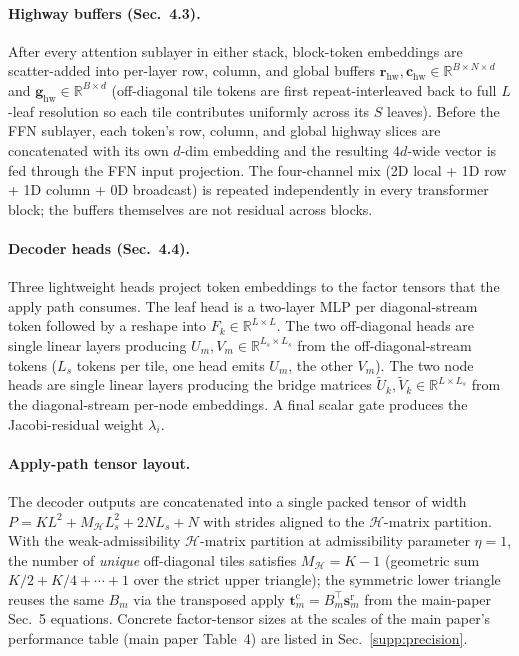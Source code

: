\documentclass[acmtog,anonymous,review]{acmart}
\begin{document}
\paragraph{Highway buffers (Sec.~4.3).}
After every attention sublayer in either stack, block-token embeddings are
scatter-added into per-layer row, column, and global buffers
$\mathbf{r}_{\mathrm{hw}}, \mathbf{c}_{\mathrm{hw}}\!\in\!\mathbb{R}^{B\times N\times d}$
and $\mathbf{g}_{\mathrm{hw}}\!\in\!\mathbb{R}^{B\times d}$ (off-diagonal tile
tokens are first repeat-interleaved back to full $L$-leaf resolution so each tile
contributes uniformly across its $S$ leaves). Before the FFN sublayer, each
token's row, column, and global highway slices are concatenated with its own
$d$-dim embedding and the resulting $4d$-wide vector is fed through the FFN input
projection. The four-channel mix (2D local + 1D row + 1D column + 0D broadcast)
is repeated independently in every transformer block; the buffers themselves are
not residual across blocks.

\paragraph{Decoder heads (Sec.~4.4).}
Three lightweight heads project token embeddings to the factor tensors that the
apply path consumes. The leaf head is a two-layer MLP per diagonal-stream token
followed by a reshape into $F_k\!\in\!\mathbb{R}^{L\times L}$. The two
off-diagonal heads are single linear layers producing
$U_m, V_m\!\in\!\mathbb{R}^{L_s\times L_s}$ from the off-diagonal-stream tokens
($L_s$ tokens per tile, one head emits $U_m$, the other $V_m$). The two node
heads are single linear layers producing the bridge matrices
$\tilde U_k, \tilde V_k\!\in\!\mathbb{R}^{L\times L_s}$ from the diagonal-stream
per-node embeddings. A final scalar gate produces the Jacobi-residual weight
$\lambda_i$.

\paragraph{Apply-path tensor layout.}
The decoder outputs are concatenated into a single packed tensor of width
$P\!=\!KL^2 + M_{\mathcal{H}} L_s^2 + 2NL_s + N$ with strides aligned to the
$\mathcal{H}$-matrix partition. With the weak-admissibility $\mathcal{H}$-matrix partition at
admissibility parameter $\eta\!=\!1$, the number of \emph{unique} off-diagonal
tiles satisfies $M_{\mathcal{H}}\!=\!K\!-\!1$ (geometric sum
$K/2 + K/4 + \cdots + 1$ over the strict upper triangle); the symmetric lower
triangle reuses the same $B_m$ via the transposed apply
$\mathbf{t}^{\mathrm{c}}_m\!=\!B_m^\top\mathbf{s}^{\mathrm{r}}_m$ from the
main-paper Sec.~5 equations. Concrete factor-tensor sizes at the scales of the main paper's
performance table (main paper Table~4) are listed in Sec.~\ref{supp:precision}.
\end{document}
